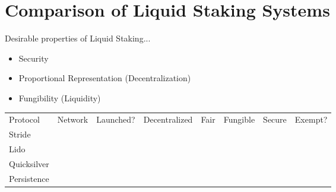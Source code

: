 \section{Comparison of Liquid Staking Systems}
Desirable properties of Liquid Staking...

\begin{itemize}
    \item Security
    \item Proportional Representation (Decentralization)
    \item Fungibility (Liquidity)
\end{itemize}

\begin{table}[]
  \begin{tabular}{llllllll}
  Protocol          & Network & Launched? & Decentralized & Fair & Fungible & Secure & Exempt? \\
  Stride            &         &           &               &      &          &        &         \\
  Lido              &         &           &               &      &          &        &         \\
  Quicksilver       &         &           &               &      &          &        &         \\
  Persistence       &         &           &               &      &          &        &
  \end{tabular}
\end{table}
